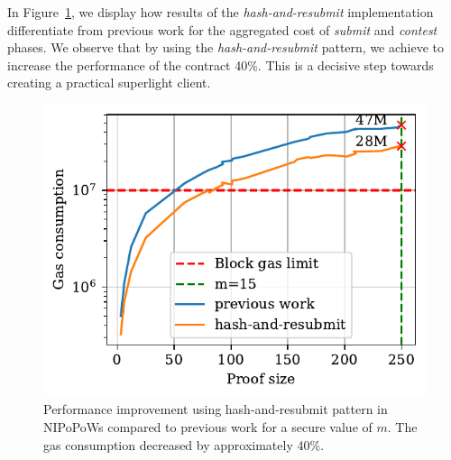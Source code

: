 In Figure~\ref{fig:har-nipopow}, we display how results of the
\emph{hash-and-resubmit} implementation differentiate from previous work for
the aggregated cost of \emph{submit} and \emph{contest} phases.  We observe
that by using the \emph{hash-and-resubmit} pattern, we achieve to increase the
performance of the contract 40\%. This is a decisive step towards creating a
practical superlight client.



\begin{figure}[!h]
    \begin{center}
        \includegraphics[width=1\columnwidth]{figures/har-nipopows.pdf}
    \end{center}
    \caption{Performance improvement using hash-and-resubmit pattern in
    NIPoPoWs compared to previous work for a secure value of $m$. The gas
    consumption decreased by approximately 40\%.}
    \label{fig:har-nipopow}
\end{figure}
